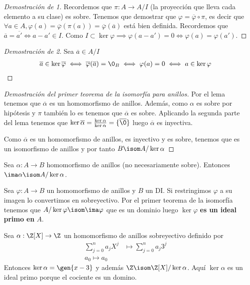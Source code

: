 \begin{proof}[Demostración de 1]
	Recordemos que $\pi:A \to A/I$ (la proyección que lleva cada elemento a su clase) es sobre. Tenemos que demostrar que $\varphi = \overline{\varphi} \circ \pi$, es decir que $\forall a \in A, \varphi(a) = \overline{\varphi}(\pi(a))= \overline{\varphi}(\overline{a})$ está bien definida. Recordemos que $\overline{a} = \overline{a'} \iff a - a' \in I$. Como $I \subset \ker \varphi \implies \varphi(a - a') = 0 \iff \varphi(a) = \varphi(a')$.
\end{proof}

\begin{proof}[Demostración de 2]
	Sea $\overline{a} \in A/I$
	\begin{align*}
		\overline{a} \in \ker \overline{\varphi} \iff \overline{\varphi}(\overline{a}) = \0_B \iff \varphi(a) = 0 \iff a \in \ker \varphi
	\end{align*}
\end{proof}

\begin{proof}[Demostración del primer teorema de la isomorfía para anillos]
	Por el lema tenemos que $\overline{\alpha}$ es un homomorfismo de anillos. Además, como $\alpha$ es sobre por hipótesis y $\pi$ también lo es tenemos que $\overline{\alpha}$ es sobre. Aplicando la segunda parte del lema tenemos que $\ker \overline{\alpha} = \frac{\ker \alpha}{\ker \alpha} = \{\overline{\0}\}$ luego $\overline{\alpha}$ es inyectiva.
	
	Como $\overline{\alpha}$ es un homomorfismo de anillos, es inyectivo y es sobre, tenemos que es un isomorfismo de anillos y por tanto $B \isom A / \ker \alpha$
\end{proof}

\begin{cor}
	Sea $\alpha: A \to B$ homomorfismo de anillos (no necesariamente sobre). Entonces $\ima \alpha \isom A / \ker \alpha$.
\end{cor}

\begin{obs}
	Sea $\varphi:A \to B$ un homomorfismo de anillos y $B$ un DI. Si restringimos $\varphi$ a su imagen lo convertimos en sobreyectivo. Por el primer teorema de la isomorfía tenemos que $A / \ker \varphi \isom \ima \varphi$ que es un dominio luego $\ker \varphi$ \textbf{es un ideal primo en} $A$.
\end{obs}

\begin{ej}
	Sea $\alpha:\Z[X] \to \Z$ un homomorfismo de anillos sobreyectivo definido por
	\begin{align*}
		\sum_{j=0}^{n}a_jX^j &\mapsto \sum_{j=0}^n a_j 3^j \\
		a_0 \mapsto a_0
	\end{align*}
	Entonces $\ker \alpha = \gen{x-3}$ y además $\Z \isom \Z[X] / \ker \alpha$. Aquí $\ker \alpha$ es un ideal primo porque el cociente es un domino.
\end{ej}


